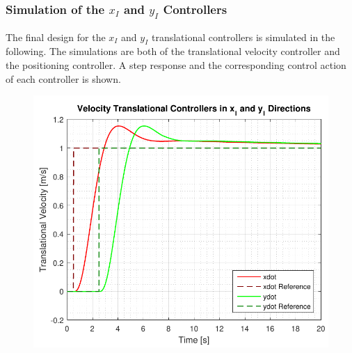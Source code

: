 \subsubsection{Simulation of the $x_I$ and $y_I$ Controllers}
The final design for the $x_I$ and $y_I$ translational controllers is simulated in the following. The simulations are both of the translational velocity controller and the positioning controller. A step response and the corresponding control action of each controller is shown.
%
\begin{minipage}{\linewidth}
    \begin{minipage}{0.5\linewidth}
        \begin{figure}[H]
            \includegraphics[scale=.58]{figures/velocityControllersXY}
            \centering			
            \label{fig:velocityControllersXY}
        \end{figure}
    \end{minipage}
    \hspace{0.03\linewidth}
    \begin{minipage}{0.5\linewidth}
        \begin{figure}[H]

\end{figure}
\end{minipage}
\end{minipage}
